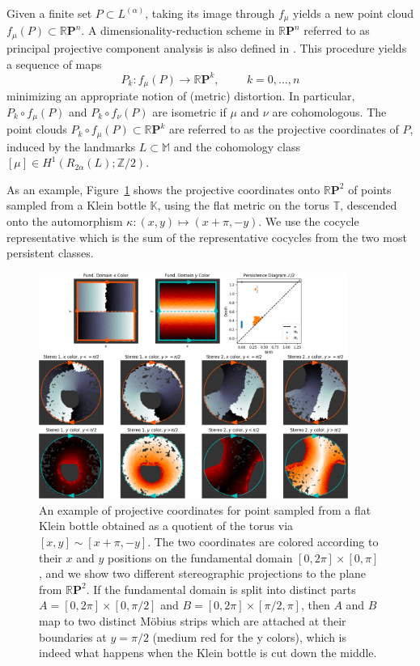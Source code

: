 \documentclass[11pt]{article}
\theoremstyle{definition}
\theoremstyle{remark}
\newcommand{\ZZ}{\mathbb{Z}}
\newcommand{\KK}{\mathbb{K}}
\newcommand{\MM}{\mathbb{M}}
\newcommand{\RP}{\mathbb{R}\mathbf{P}}
\newcommand{\TT}{\mathbb{T}}
\begin{document}
    Given a finite set $P \subset L^{(\alpha)}$, taking its image
    through $f_\mu$ yields a new point cloud
    $f_\mu(P) \subset \RP^n$.
    A dimensionality-reduction scheme in
    $\RP^n$ referred to as  principal projective component
    analysis is also defined in \cite{perea2018multiscale}.
    This procedure yields
    a sequence of maps
    \[
    P_k : f_\mu(P) \longrightarrow \RP^k, \hspace{1cm}
     k = 0,  \ldots, n
     \]
    minimizing an appropriate notion of (metric) distortion.
    In particular, $P_k\circ f_\mu(P)$ and
    $P_k \circ f_\nu(P)$ are isometric if $\mu$ and $\nu$ are cohomologous.
    The point clouds
    $P_k \circ f_\mu(P) \subset \RP^k$
    are referred to as the projective
    coordinates of $P$, induced by the landmarks
    $L \subset \MM$ and the cohomology class
    $\left[\mu \right] \in H^1(R_{2\alpha}(L); \ZZ/2)$.

    As an example, Figure~\ref{fig:ProjectiveCoordsExample} shows the projective coordinates onto $\RP^2$ of points sampled from a Klein bottle $\KK$, using the flat metric on the torus $\TT$, descended onto the automorphism $\kappa: (x,y) \mapsto (x+\pi, -y)$.
    We use the cocycle representative which is the sum of the  representative cocycles from the two most persistent classes.

    \begin{figure}[!htb]
        \centering
        \includegraphics[width=0.9\textwidth]{ProjectiveCoordinatesExample.png}
        \caption{An example of projective coordinates for point sampled from a flat Klein bottle   obtained as a quotient of the torus via $[x, y] \sim [x + \pi, -y]$.  The two coordinates are colored according to their $x$ and $y$ positions on the fundamental domain $[0, 2 \pi] \times [0, \pi]$, and we show two different stereographic projections to the plane from $\RP^2$.  If the fundamental domain is split into distinct parts $A = [0, 2 \pi] \times [0, \pi/2]$ and $B = [0, 2 \pi] \times [\pi/2, \pi]$, then $A$ and $B$ map to two distinct M{\"o}bius strips which are attached at their boundaries at $y = \pi/2$ (medium red for the y colors), which is indeed what happens when the Klein bottle is cut down the middle.}
        \label{fig:ProjectiveCoordsExample}
    \end{figure}
\end{document}
